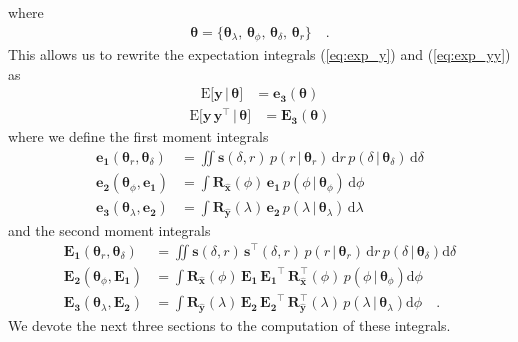\documentclass[modern]{aastex62}
\begin{document}
%
where
%
\begin{align}
    \pmb{\theta} = \big\{
    \pmb{\theta}_{\lambda}, \,
    \pmb{\theta}_{\phi}, \,
    \pmb{\theta}_{\delta}, \,
    \pmb{\theta}_{r} \big\}
    \quad.
\end{align}
%
This allows us to rewrite the expectation integrals (\ref{eq:exp_y})
and (\ref{eq:exp_yy}) as
%
\begin{align}
    \label{eq:exp_y_sep}
    \mathrm{E} \Big[ \mathbf{y} \, \Big| \, \pmb{\theta} \Big]
     & =
    \mathbf{e_3}(\pmb{\theta})
\end{align}
\begin{align}
    \label{eq:exp_yy_sep}
    \mathrm{E} \Big[ \mathbf{y} \, \mathbf{y}^\top \, \Big| \, \pmb{\theta} \Big]
     & =
    \mathbf{E_3}(\pmb{\theta})
\end{align}
%
where we define the first moment integrals
%
\begin{align}
    \mathbf{e_1}(\pmb{\theta}_r, \pmb{\theta}_\delta)
     & =
    \iint
    \mathbf{s}(\delta, r) \,
    p(r \, \big| \, \pmb{\theta}_{r}) \,
    \mathrm{d}r \,
    p(\delta \, \big| \, \pmb{\theta}_{\delta}) \,
    \mathrm{d}\delta
    \\[1em]
    \mathbf{e_2}(\pmb{\theta}_\phi, \mathbf{e_1})
     & =
    \int
    \mathbf{R}_{\hat{\mathbf{x}}}(\phi) \,
    \mathbf{e_1} \,
    p(\phi \, \big| \, \pmb{\theta}_{\phi}) \,
    \mathrm{d}\phi
    \\[1em]
    \mathbf{e_3}(\pmb{\theta}_\lambda, \mathbf{e_2})
     & =
    \int
    \mathbf{R}_{\hat{\mathbf{y}}}(\lambda) \,
    \mathbf{e_2} \,
    p(\lambda \, \big| \, \pmb{\theta}_{\lambda}) \,
    \mathrm{d}\lambda
\end{align}
%
and the second moment integrals
%
\begin{align}
    \mathbf{E_1}(\pmb{\theta}_r, \pmb{\theta}_\delta)
     & =
    \iint
    \mathbf{s}(\delta, r) \, \mathbf{s}^\top(\delta, r) \,
    p(r \, \big| \, \pmb{\theta}_{r}) \,
    \mathrm{d}r \,
    p(\delta \, \big| \, \pmb{\theta}_{\delta})
    \mathrm{d}\delta
    \\[1em]
    \mathbf{E_2}(\pmb{\theta}_\phi, \mathbf{E_1})
     & =
    \int
    \mathbf{R}_{\hat{\mathbf{x}}}(\phi) \,
    \mathbf{E_1} \,
    \mathbf{E_1}^\top \,
    \mathbf{R}_{\hat{\mathbf{x}}}^\top(\phi) \,
    p(\phi \, \big| \, \pmb{\theta}_{\phi})
    \mathrm{d}\phi
    \\[1em]
    \mathbf{E_3}(\pmb{\theta}_\lambda, \mathbf{E_2})
     & =
    \int
    \mathbf{R}_{\hat{\mathbf{y}}}(\lambda) \,
    \mathbf{E_2} \,
    \mathbf{E_2}^\top \,
    \mathbf{R}_{\hat{\mathbf{y}}}^\top(\lambda) \,
    p(\lambda \, \big| \, \pmb{\theta}_{\lambda})
    \mathrm{d}\phi
    \quad.
\end{align}
%
We devote the next three sections to the computation of these
integrals.
\end{document}
